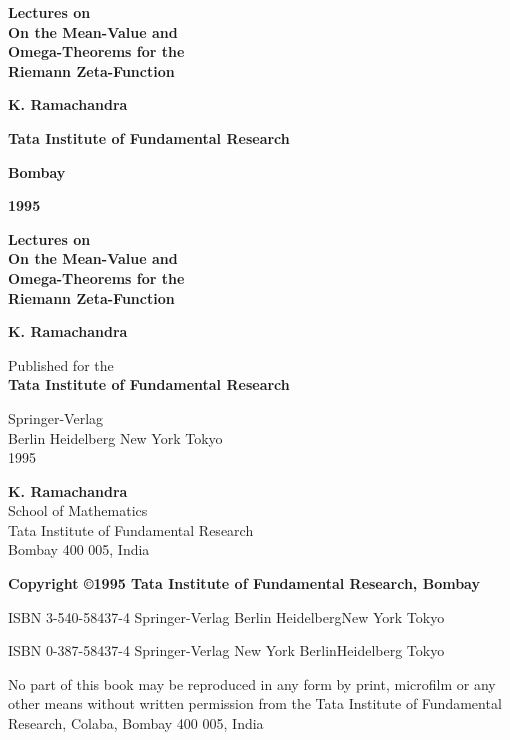 \thispagestyle{empty}
\begin{center}
{\Large\bf Lectures on}\\[5pt]
{\Large\bf On the Mean-Value and}\\[5pt]
{\Large\bf Omega-Theorems for the}\\[5pt]
{\Large\bf Riemann Zeta-Function}
\vfill

{\large\bf K. Ramachandra}
\vfill

{\bf Tata Institute of Fundamental Research}

{\bf Bombay}

{\bf 1995}
\end{center}

\eject

\thispagestyle{empty}

\begin{center}
{\Large\bf Lectures on}\\[5pt]
{\Large\bf On the Mean-Value and}\\[5pt]
{\Large\bf Omega-Theorems for the}\\[5pt]
{\Large\bf Riemann Zeta-Function}
\vfill

{\large\bf K. Ramachandra}
\vfill

Published for the\\

{\bf Tata Institute of Fundamental Research}
\vfill

{\Large Springer-Verlag}\\[5pt]
Berlin Heidelberg New York Tokyo\\[5pt]
1995
\end{center}
\eject

\thispagestyle{empty}

\noindent
{\large\bf K. Ramachandra}\\[5pt]
School of Mathematics\\
Tata Institute of Fundamental Research\\
Bombay 400 005, India
\vfill

\noindent
{\bf Copyright \copyright 1995 Tata Institute of Fundamental Research,\hfil\break
  Bombay} 
\vfill

\noindent
ISBN 3-540-58437-4 Springer-Verlag Berlin Heidelberg\hfil\break New York Tokyo

\noindent
ISBN 0-387-58437-4 Springer-Verlag New York Berlin\hfil\break Heidelberg Tokyo
\vfill


\noindent
No part of this book may be reproduced in any form
by print, microfilm or any other means without written
permission from the Tata Institute of Fundamental Research,
Colaba, Bombay 400 005, India
\vfill


